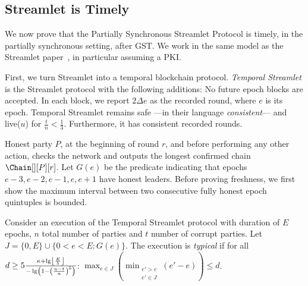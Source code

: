 \subsection{Streamlet is Timely}

We now prove that the Partially Synchronous Streamlet Protocol is timely,
in the partially synchronous setting, after GST.
We work in the same model as the Streamlet paper~\cite{streamlet},
in particular assuming a PKI.

First, we turn Streamlet into a temporal blockchain protocol.
\emph{Temporal Streamlet} is the Streamlet protocol with the
following additions: No future epoch blocks are accepted. In each block, we report
$2\Delta e$ as the recorded round, where $e$ is its epoch.
Temporal Streamlet remains safe ---in their language \emph{consistent}--- and live($u$)
for $\frac{t}{n} < \frac{1}{3}$. Furthermore, it has consistent recorded rounds.

Honest party $P$, at the beginning of round $r$, and
before performing any other action, checks the network and
outputs the longest confirmed chain $\Chain[][P][r]$.
Let $G(e)$ be the predicate indicating that epochs $e-3,e-2,e-1,e,e+1$ have honest leaders.
Before proving freshness, we first show the maximum interval between two consecutive fully
honest epoch quintuples is bounded.

\begin{definition}
  Consider an execution of the Temporal Streamlet protocol with duration
  of $E$ epochs, $n$ total number of parties and $t$ number of corrupt parties.
  Let $J = \{0,E\} \cup \{0 < e < E: G(e)\}$.
  The execution is \emph{typical} if for all
  $d \geq 5\frac{\kappa + \lg \floor*{\frac{E}{5}}}{- \lg \left(1 - \left(\frac{n - t}{n}\right)^5\right)}$:
  $\max_{e \in J}(\min_{\substack{e' > e \\ e' \in J}}(e' - e)) \leq d$.
\end{definition}

